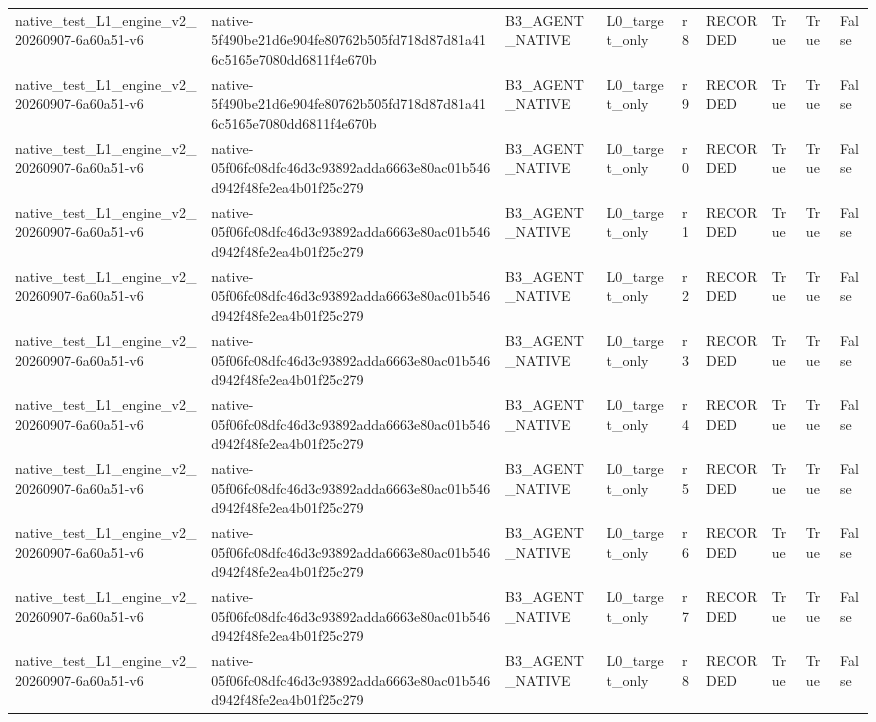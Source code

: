 \begin{tabular}{lllllllll}
native\_test\_L1\_engine\_v2\_20260907-6a60a51-v6 & native-5f490be21d6e904fe80762b505fd718d87d81a416c5165e7080dd6811f4e670b & B3\_AGENT\_NATIVE & L0\_target\_only & r8 & RECORDED & True & True & False \\
native\_test\_L1\_engine\_v2\_20260907-6a60a51-v6 & native-5f490be21d6e904fe80762b505fd718d87d81a416c5165e7080dd6811f4e670b & B3\_AGENT\_NATIVE & L0\_target\_only & r9 & RECORDED & True & True & False \\
native\_test\_L1\_engine\_v2\_20260907-6a60a51-v6 & native-05f06fc08dfc46d3c93892adda6663e80ac01b546d942f48fe2ea4b01f25c279 & B3\_AGENT\_NATIVE & L0\_target\_only & r0 & RECORDED & True & True & False \\
native\_test\_L1\_engine\_v2\_20260907-6a60a51-v6 & native-05f06fc08dfc46d3c93892adda6663e80ac01b546d942f48fe2ea4b01f25c279 & B3\_AGENT\_NATIVE & L0\_target\_only & r1 & RECORDED & True & True & False \\
native\_test\_L1\_engine\_v2\_20260907-6a60a51-v6 & native-05f06fc08dfc46d3c93892adda6663e80ac01b546d942f48fe2ea4b01f25c279 & B3\_AGENT\_NATIVE & L0\_target\_only & r2 & RECORDED & True & True & False \\
native\_test\_L1\_engine\_v2\_20260907-6a60a51-v6 & native-05f06fc08dfc46d3c93892adda6663e80ac01b546d942f48fe2ea4b01f25c279 & B3\_AGENT\_NATIVE & L0\_target\_only & r3 & RECORDED & True & True & False \\
native\_test\_L1\_engine\_v2\_20260907-6a60a51-v6 & native-05f06fc08dfc46d3c93892adda6663e80ac01b546d942f48fe2ea4b01f25c279 & B3\_AGENT\_NATIVE & L0\_target\_only & r4 & RECORDED & True & True & False \\
native\_test\_L1\_engine\_v2\_20260907-6a60a51-v6 & native-05f06fc08dfc46d3c93892adda6663e80ac01b546d942f48fe2ea4b01f25c279 & B3\_AGENT\_NATIVE & L0\_target\_only & r5 & RECORDED & True & True & False \\
native\_test\_L1\_engine\_v2\_20260907-6a60a51-v6 & native-05f06fc08dfc46d3c93892adda6663e80ac01b546d942f48fe2ea4b01f25c279 & B3\_AGENT\_NATIVE & L0\_target\_only & r6 & RECORDED & True & True & False \\
native\_test\_L1\_engine\_v2\_20260907-6a60a51-v6 & native-05f06fc08dfc46d3c93892adda6663e80ac01b546d942f48fe2ea4b01f25c279 & B3\_AGENT\_NATIVE & L0\_target\_only & r7 & RECORDED & True & True & False \\
native\_test\_L1\_engine\_v2\_20260907-6a60a51-v6 & native-05f06fc08dfc46d3c93892adda6663e80ac01b546d942f48fe2ea4b01f25c279 & B3\_AGENT\_NATIVE & L0\_target\_only & r8 & RECORDED & True & True & False \\

\end{tabular}
